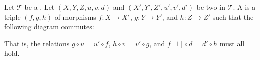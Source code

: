 \begin{definition} \label{definition:morphism_of_distinguished_triangles_in_a_triangulated_category}
Let $\mathcal{T}$ be a . Let $(X, Y, Z, u, v, d)$ and $(X', Y', Z', u', v', d')$ be two  in $\mathcal{T}$. A  is a triple $(f, g, h)$ of morphisms $f: X \to X'$, $g: Y \to Y'$, and $h: Z \to Z'$ such that the following diagram commutes:
\begin{center}
\end{center}
That is, the relations $g \circ u = u' \circ f$, $h \circ v = v' \circ g$, and $f[1] \circ d = d' \circ h$ must all hold.
\end{definition}